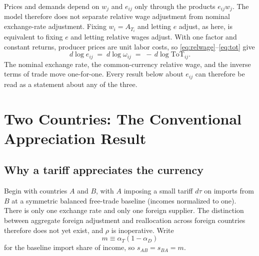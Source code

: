\documentclass[11pt]{article}
\begin{document}
Prices and demands depend on $w_j$ and $e_{ij}$ only through the products $e_{ij}w_j$. The model therefore does not separate relative wage adjustment from nominal exchange-rate adjustment. Fixing $w_i = A_{T_i}$ and letting $e$ adjust, as here, is equivalent to fixing $e$ and letting relative wages adjust. With one factor and constant returns, producer prices are unit labor costs, so \eqref{eq:relwage}--\eqref{eq:tot} give
\begin{equation}
d\log e_{ij} \;=\; d\log \omega_{ij} \;=\; -\,d\log \mathrm{ToT}_{ij} .
\label{eq:onetoone}
\end{equation}
The nominal exchange rate, the common-currency relative wage, and the inverse terms of trade move one-for-one. Every result below about $e_{ij}$ can therefore be read as a statement about any of the three.

\section{Two Countries: The Conventional Appreciation Result}

\subsection{Why a tariff appreciates the currency}

Begin with countries $A$ and $B$, with $A$ imposing a small tariff $d\tau$ on imports from $B$ at a symmetric balanced free-trade baseline (incomes normalized to one). There is only one exchange rate and only one foreign supplier. The distinction between aggregate foreign adjustment and reallocation across foreign countries therefore does not yet exist, and $\rho$ is inoperative. Write
\begin{equation}
m \equiv \alpha_T(1-\alpha_D)
\label{eq:m-def}
\end{equation}
for the baseline import share of income, so $s_{AB} = s_{BA} = m$.
\end{document}
